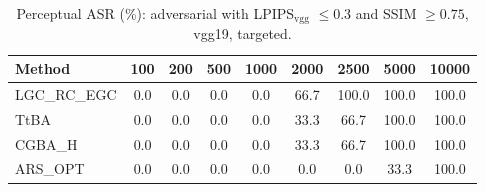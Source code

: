 \begin{table}[t]
\centering\footnotesize
\caption{Perceptual ASR (\%): adversarial with LPIPS$_{\mathrm{vgg}}$ $\le 0.3$ and SSIM $\ge 0.75$, vgg19, targeted.}
\begin{tabular}{lcccccccc}
\toprule
Method & 100 & 200 & 500 & 1000 & 2000 & 2500 & 5000 & 10000 \\
\midrule
LGC\_RC\_EGC & 0.0 & 0.0 & 0.0 & 0.0 & 66.7 & 100.0 & 100.0 & 100.0 \\
TtBA & 0.0 & 0.0 & 0.0 & 0.0 & 33.3 & 66.7 & 100.0 & 100.0 \\
CGBA\_H & 0.0 & 0.0 & 0.0 & 0.0 & 33.3 & 66.7 & 100.0 & 100.0 \\
ARS\_OPT & 0.0 & 0.0 & 0.0 & 0.0 & 0.0 & 0.0 & 33.3 & 100.0 \\
\bottomrule
\end{tabular}
\end{table}
